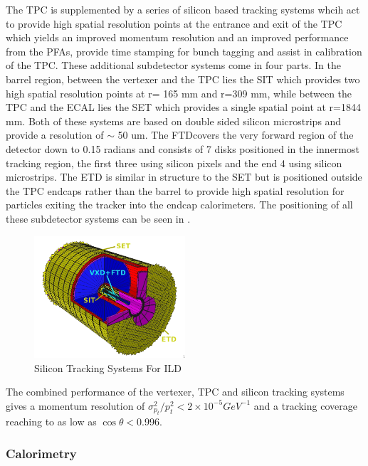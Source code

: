 The \ac{TPC} is supplemented by a series of silicon based tracking systems whcih act to provide high spatial resolution points at the entrance and exit of the TPC which yields an improved momentum resolution and an improved performance from the \ac{PFA}s, provide time stamping for bunch tagging and assist in calibration of the \ac{TPC}. These additional subdetector systems come in four parts. In the barrel region, between the vertexer and the \ac{TPC} lies the \ac{SIT} which provides two high spatial resolution points at r= 165 mm and r=309 mm, while between the \ac{TPC} and the \ac{ECAL} lies the \ac{SET} which provides a single spatial point at r=1844 mm. Both of these systems are based on double sided silicon microstrips and provide a resolution of $\sim$ 50 um. The \ac{FTD}covers the very forward region of the detector down to 0.15 radians and consists of 7 disks positioned in the innermost tracking region, the first three using silicon pixels and the end 4 using silicon microstrips. The \ac{ETD} is similar in structure to the \ac{SET} but is positioned outside the \ac{TPC} endcaps rather than the barrel to provide high spatial resolution for particles exiting the tracker into the endcap calorimeters. The positioning of all these subdetector systems can be seen in .

\begin{figure}
  \centering
  \includegraphics[width=0.5\textwidth,keepaspectratio]{Experiments/fig/SiliconTrackers}
  \caption[Silicon Tracking Systems For ILD]{Silicon Tracking Systems For ILD \cite{ILD}}
  \label{fig:silicontracking}
\end{figure}

The combined performance of the vertexer, \ac{TPC} and silicon tracking systems gives a momentum resolution of $\sigma_{p_t}^2/ p_{t}^2 < 2 \times 10^{-5} GeV^{-1}$ and a tracking coverage reaching to as low as $\cos\theta<$0.996.


\subsubsection{Calorimetry}

